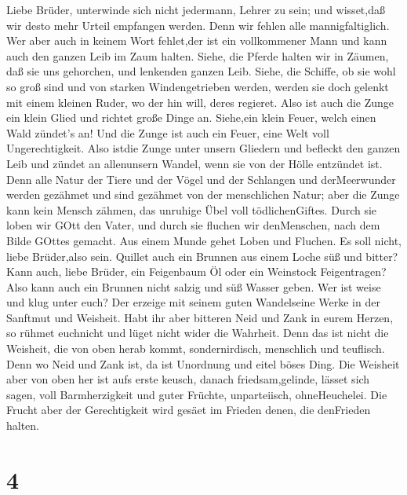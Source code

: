  Liebe Brüder, unterwinde sich nicht jedermann, Lehrer zu
sein; und wisset,daß wir desto mehr Urteil empfangen werden.
 Denn wir fehlen alle mannigfaltiglich. Wer aber auch in
keinem Wort fehlet,der ist ein vollkommener Mann und kann auch den
ganzen Leib im Zaum halten.  Siehe, die Pferde halten wir in
Zäumen, daß sie uns gehorchen, und lenkenden ganzen Leib. 
Siehe, die Schiffe, ob sie wohl so groß sind und von starken
Windengetrieben werden, werden sie doch gelenkt mit einem kleinen Ruder,
wo der hin will, deres regieret.  Also ist auch die Zunge
ein klein Glied und richtet große Dinge an. Siehe,ein klein Feuer, welch
einen Wald zündet's an!  Und die Zunge ist auch ein Feuer,
eine Welt voll Ungerechtigkeit. Also istdie Zunge unter unsern Gliedern
und befleckt den ganzen Leib und zündet an allenunsern Wandel, wenn sie
von der Hölle entzündet ist.  Denn alle Natur der Tiere und
der Vögel und der Schlangen und derMeerwunder werden gezähmet und sind
gezähmet von der menschlichen Natur;  aber die Zunge kann
kein Mensch zähmen, das unruhige Übel voll tödlichenGiftes. 
Durch sie loben wir GOtt den Vater, und durch sie fluchen wir
denMenschen, nach dem Bilde GOttes gemacht.  Aus einem
Munde gehet Loben und Fluchen. Es soll nicht, liebe Brüder,also sein.
 Quillet auch ein Brunnen aus einem Loche süß und bitter?
 Kann auch, liebe Brüder, ein Feigenbaum Öl oder ein
Weinstock Feigentragen? Also kann auch ein Brunnen nicht salzig und süß
Wasser geben.  Wer ist weise und klug unter euch? Der
erzeige mit seinem guten Wandelseine Werke in der Sanftmut und Weisheit.
 Habt ihr aber bitteren Neid und Zank in eurem Herzen, so
rühmet euchnicht und lüget nicht wider die Wahrheit.  Denn
das ist nicht die Weisheit, die von oben herab kommt, sondernirdisch,
menschlich und teuflisch.  Denn wo Neid und Zank ist, da
ist Unordnung und eitel böses Ding.  Die Weisheit aber von
oben her ist aufs erste keusch, danach friedsam,gelinde, lässet sich
sagen, voll Barmherzigkeit und guter Früchte, unparteiisch,
ohneHeuchelei.  Die Frucht aber der Gerechtigkeit wird
gesäet im Frieden denen, die denFrieden halten.

\hypertarget{section-3}{%
\section{4}\label{section-3}}

